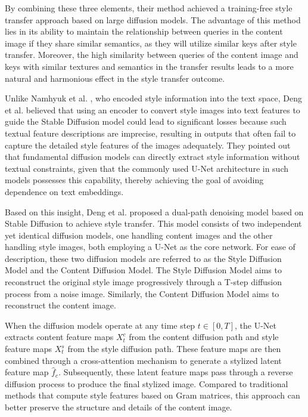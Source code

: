 \documentclass[preprint,12pt]{elsarticle}
\begin{document}
By combining these three elements, their method achieved a training-free style transfer approach based on large diffusion models. The advantage of this method lies in its ability to maintain the relationship between queries in the content image if they share similar semantics, as they will utilize similar keys after style transfer. Moreover, the high similarity between queries of the content image and keys with similar textures and semantics in the transfer results leads to a more natural and harmonious effect in the style transfer outcome.

Unlike Namhyuk et al. \citep{63ahn2024dreamstyler}, who encoded style information into the text space, Deng et al.\citep{67deng2024z} believed that using an encoder to convert style images into text features to guide the Stable Diffusion model could lead to significant losses because such textual feature descriptions are imprecise, resulting in outputs that often fail to capture the detailed style features of the images adequately. They pointed out that fundamental diffusion models can directly extract style information without textual constraints, given that the commonly used U-Net architecture in such models possesses this capability, thereby achieving the goal of avoiding dependence on text embeddings.

Based on this insight, Deng et al. proposed a dual-path denoising model based on Stable Diffusion to achieve style transfer. This model consists of two independent yet identical diffusion models, one handling content images and the other handling style images, both employing a U-Net as the core network. For ease of description, these two diffusion models are referred to as the Style Diffusion Model and the Content Diffusion Model. The Style Diffusion Model aims to reconstruct the original style image progressively through a T-step diffusion process from a noise image. Similarly, the Content Diffusion Model aims to reconstruct the content image.

When the diffusion models operate at any time step $t \in [0, T]$, the U-Net extracts content feature maps $X^c_t$ from the content diffusion path and style feature maps $X^s_t$ from the style diffusion path. These feature maps are then combined through a cross-attention mechanism to generate a stylized latent feature map $\hat f_c$. Subsequently, these latent feature maps pass through a reverse diffusion process to produce the final stylized image. Compared to traditional methods that compute style features based on Gram matrices, this approach can better preserve the structure and details of the content image.
\end{document}
